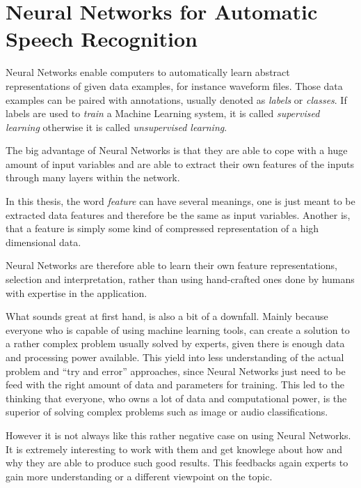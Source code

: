 
\section{Neural Networks for Automatic Speech Recognition}\label{sec:intro_nn}

Neural Networks enable computers to automatically learn abstract representations of given data examples, for instance waveform files.
Those data examples can be paired with annotations, usually denoted as \emph{labels} or \emph{classes}.
If labels are used to \emph{train} a Machine Learning system, it is called \emph{supervised learning} otherwise it is called \emph{unsupervised learning}.

The big advantage of Neural Networks is that they are able to cope with a huge amount of input variables and are able to extract their own features of the inputs through many layers within the network.

In this thesis, the word \emph{feature} can have several meanings, one is just meant to be extracted data features and therefore be the same as input variables. 
Another is, that a feature is simply some kind of compressed representation of a high dimensional data.

Neural Networks are therefore able to learn their own feature representations, selection and interpretation, rather than using hand-crafted ones done by humans with expertise in the application. 

What sounds great at first hand, is also a bit of a downfall.
Mainly because everyone who is capable of using machine learning tools, can create a solution to a rather complex problem usually solved by experts, given there is enough data and processing power available.
This yield into less understanding of the actual problem and \enquote{try and error} approaches, since Neural Networks just need to be feed with the right amount of data and parameters for training.
This led to the thinking that everyone, who owns a lot of data and computational power, is the superior of solving complex problems such as image or audio classifications.

However it is not always like this rather negative case on using Neural Networks. 
It is extremely interesting to work with them and get knowlege about how and why they are able to produce such good results.
This feedbacks again experts to gain more understanding or a different viewpoint on the topic.
